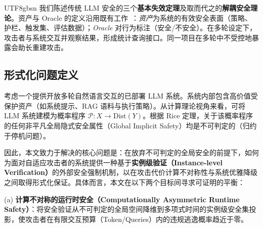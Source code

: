 \documentclass[letterpaper,twocolumn,10pt]{article}
\begin{document}
\begin{CJK}{UTF8}{gbsn}
我们陈述传统 LLM 安全的三个\textbf{基本失效定理}及取而代之的\textbf{解耦安全理论}。资产与 Oracle 的定义沿用既有工作~\cite{llm-reconstruction-emergent,ControlledMutation_SafetyEval}：\emph{资产}为系统的有效安全表面（策略、护栏、触发集、评估数据）；\emph{Oracle} 对行为标注（安全/不安全）。在多轮设定下，攻击者与系统交互并观察结果，形成统计查询接口。同一项目在多轮中不受控地暴露会助长重建攻击。

\subsection{形式化问题定义}
\label{sec:problem-statement}

考虑一个提供开放多轮自然语言交互的已部署 LLM 系统。系统内部包含高价值受保护资产（如系统提示、RAG 语料与执行策略）。从计算理论视角来看，可将 LLM 系统建模为概率程序 $\mathcal{P}: X \to \mathrm{Dist}(Y)$。根据 Rice 定理，关于该概率程序的任何非平凡全局隐式安全属性（Global Implicit Safety）均是不可判定的（归约于停机问题）。

\noindent{}

因此，本文致力于解决的核心问题是：在放弃不可判定的全局安全的前提下，如何为面对自适应攻击者的系统提供一种基于\textbf{实例级验证（Instance-level Verification）}的外部安全强制机制，以在攻击代价计算不对称性与系统优雅降级之间取得形式化保证。具体而言，本文在以下两个目标间寻求可证明的平衡：

\noindent (a) \textbf{计算不对称的运行时安全（Computationally Asymmetric Runtime Safety）}：将安全验证从不可判定的全局空间降维到多项式时间的实例级安全集投影，使攻击者在有限交互预算（Token/Queries）内的违规逃逸概率趋近于零。


\end{CJK}
\end{document}
